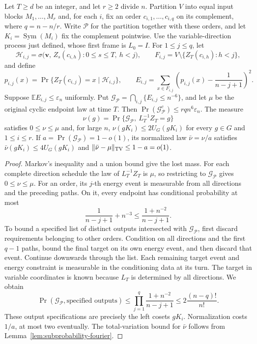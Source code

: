 \begin{lemma}
\label{frames:backward-removal}
Let $T\ge d$ be an integer, and let $r\ge2$ divide $n$. Partition $V$
into equal input blocks $M_1,\ldots,M_r$ and, for each $i$, fix an order
$c_{i,1},\ldots,c_{i,q}$ on its complement, where $q=n-n/r$.
Write $\mathcal P$ for the partition together with these orders, and
let $K_i=\operatorname{Sym}(M_i)$ fix the complement pointwise.
Use the variable-direction process just defined, whose first frame is
$L_0=I$. For $1\le j\le q$, let
\[
 \mathcal H_{i,j}
 =\sigma\bigl(\mathbf v,\,
       Z_s(c_{i,h}):0\le s\le T,\ h<j\bigr),\qquad
 F_{i,j}=V\setminus\{Z_T(c_{i,h}):h<j\},
\]
and define
\[
 p_{i,j}(x)=\Pr\{Z_T(c_{i,j})=x\mid\mathcal H_{i,j}\},\qquad
 E_{i,j}=\sum_{x\in F_{i,j}}
       \left(p_{i,j}(x)-\frac1{n-j+1}\right)^2.
\]
Suppose $\mathbb E E_{i,j}\le\varepsilon_n$ uniformly. Put
$\mathcal G_{\mathcal P}=\bigcap_{i,j}\{E_{i,j}\le n^{-6}\}$, and let
$\mu$ be the original cyclic endpoint law at time $T$. Then
$\Pr(\mathcal G_{\mathcal P}^c)\le rq n^6\varepsilon_n$. The measure
\[
 \nu(g)=\Pr\{\mathcal G_{\mathcal P},\ L_T^{-1}Z_T=g\}
\]
satisfies $0\le\nu\le\mu$ and, for large $n$,
$\nu(gK_i)\le2U_G(gK_i)$ for every $g\in G$ and $1\le i\le r$. If
$a=\Pr(\mathcal G_{\mathcal P})=1-o(1)$, its normalized law
$\bar\nu=\nu/a$ satisfies $\bar\nu(gK_i)\le4U_G(gK_i)$ and
$\|\bar\nu-\mu\|_{\rm TV}\le1-a=o(1)$.
\end{lemma}

\begin{proof}
Markov's inequality and a union bound give the lost mass.
For each complete direction schedule the law of $L_T^{-1}Z_T$ is
$\mu$, so restricting to $\mathcal G_{\mathcal P}$ gives
$0\le\nu\le\mu$.
For an order, its $j$-th energy event is measurable from all directions
and the preceding paths. On it, every endpoint has conditional
probability at most
\[
 \frac1{n-j+1}+n^{-3}\le\frac{1+n^{-2}}{n-j+1}.
\]
To bound a specified list of distinct outputs intersected with
$\mathcal G_{\mathcal P}$,
first discard requirements belonging to other orders. Condition on all
directions and the first $q-1$ paths, bound the final target on its own
energy event, and then discard that event. Continue downwards through
the list. Each remaining target event and energy constraint is measurable
in the conditioning data at its turn. The target in variable coordinates
is known because $L_T$ is determined by all directions. We obtain
\[
 \Pr(\mathcal G_{\mathcal P},\text{specified outputs})
 \le\prod_{j=1}^q\frac{1+n^{-2}}{n-j+1}
 \le2\frac{(n-q)!}{n!}.
\]
These output specifications are precisely the left cosets $gK_i$.
Normalization costs $1/a$, at most two eventually. The total-variation
bound for $\bar\nu$ follows from Lemma~\ref{lem:subprobability-fourier}.
\end{proof}

